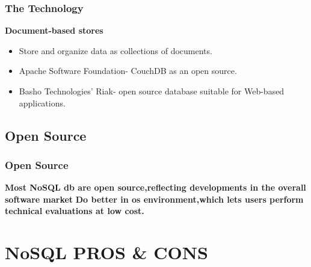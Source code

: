 \documentclass{beamer}
\begin{document}
\begin{frame}\frametitle{The Technology}
\textbf{Document-based stores}
\begin{itemize}
\item Store and organize data as collections of documents.
\item Apache Software Foundation- CouchDB as an open source.
\item Basho Technologies’ Riak-  open source database suitable for Web-based applications.
\end{itemize}
\end{frame}

\subsection[]{Open Source}
\begin{frame}\frametitle{Open Source}
\textbf{Most NoSQL db are open source,reflecting developments in the overall software market}
\newline\newline
\textbf{Do better in os environment,which lets users perform technical evaluations at low cost.}
\end{frame}

\section[]{NoSQL PROS & CONS}
\end{document}

